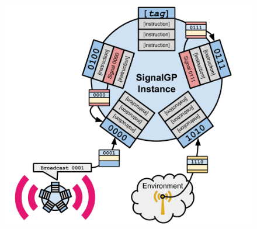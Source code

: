 

\begin{figure}
\begin{center}

\begin{minipage}{0.49\textwidth}
\centering
\includegraphics[width=\linewidth]{img/signalgp-cartoon}


\end{minipage}
\end{center}
\end{figure}

